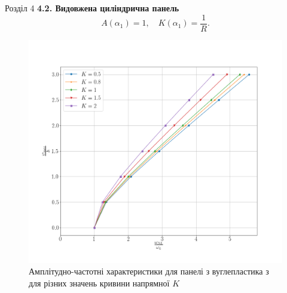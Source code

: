\documentclass[8pt]{beamer}
\numberwithin{figure}{section}
\numberwithin{equation}{section}
\numberwithin{table}{section}
\begin{document}
\begin{frame}{Розділ 4}
\textbf{4.2. Видовжена циліндрична панель}
\begin{equation}
A\left( \alpha_1 \right)=1, \quad K\left( \alpha_1 \right)=\frac{1}{R}.
\end{equation}
\begin{figure}
	\includegraphics[scale=0.2]{pic/AFR_curvature.png}
		\caption{Амплітудно-частотні характеристики для панелі з вуглепластика з для різних значень кривини напрямної $K$}
		\label{fig:AFR_layers}
\end{figure}

\end{frame}
\end{document}
